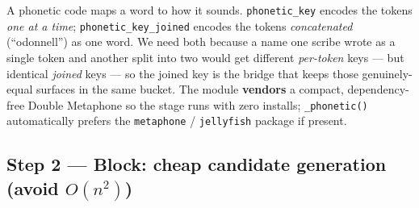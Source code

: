 \documentclass[11pt]{article}
\newcommand{\code}[1]{\texttt{#1}}
\begin{document}
\begin{primerbox}
A phonetic code maps a word to how it sounds. \code{phonetic\_key} encodes the
tokens \emph{one at a time}; \code{phonetic\_key\_joined} encodes the tokens
\emph{concatenated} (``odonnell'') as one word. We need both because a name one
scribe wrote as a single token and another split into two would get different
\emph{per-token} keys --- but identical \emph{joined} keys --- so the joined key is
the bridge that keeps those genuinely-equal surfaces in the same bucket. The module
\textbf{vendors} a compact, dependency-free Double Metaphone so the stage runs with
zero installs; \code{\_phonetic()} automatically prefers the \code{metaphone} /
\code{jellyfish} package if present.
\end{primerbox}

\subsection{Step 2 --- Block: cheap candidate generation (avoid \texorpdfstring{$O(n^2)$}{O(n2)})}
\end{document}
